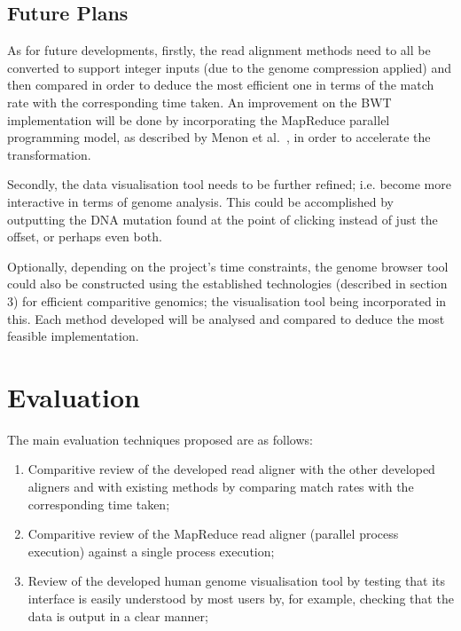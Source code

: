 \documentclass{csfyp}
\begin{document}
{{{\subsection{Future Plans}\vspace{-2ex}
As for future developments, firstly, the read alignment methods need to all be converted to support integer inputs (due to the genome compression applied) and then compared in order to deduce the most efficient one in terms of the match rate with the corresponding time taken.  An improvement on the BWT implementation will be done by incorporating the MapReduce parallel programming model, as described by Menon et al.~\cite{mapredgen}, in order to accelerate the transformation.  

Secondly, the data visualisation tool needs to be further refined; i.e. become more interactive in terms of genome analysis.  This could be accomplished by outputting the DNA mutation found at the point of clicking instead of just the offset, or perhaps even both.       

Optionally, depending on the project's time constraints, the genome browser tool could also be constructed using the established technologies (described in section 3) for efficient comparitive genomics; the visualisation tool being incorporated in this.  Each method developed will be analysed and compared to deduce the most feasible implementation.   


\section{Evaluation}\vspace{-2ex}

The main evaluation techniques proposed are as follows:

\begin{enumerate}[nolistsep]

  \item	Comparitive review of the developed read aligner with the other developed aligners and with existing methods by comparing match rates with the corresponding time taken;

  \item Comparitive review of the MapReduce read aligner (parallel process execution) against a single process execution;  

  \item Review of the developed human genome visualisation tool by testing that its interface is easily understood by most users by, for example, checking that the data is output in a clear manner;


\end{enumerate}}}}
\end{document}

